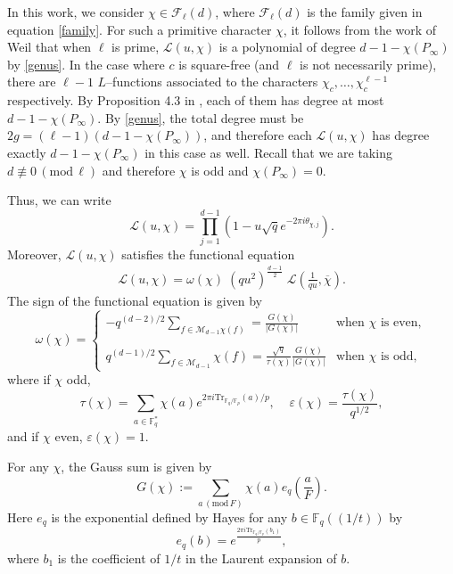 \documentclass[12pt]{amsart}
\newcommand{\F}{\mathbb{F}}
\renewcommand{\pmod}[1]{\,(\mathrm{mod}\,#1)}
\def\cL{\mathcal{L}}
\begin{document}
In this work, we consider $\chi \in \mathcal{F}_{\ell}(d)$, where $\mathcal{F}_{\ell}(d)$ is the family given in equation \eqref{family}.
For such a primitive character $\chi$, it follows from the work of Weil \cite{Weil2} that when $\ell$ is prime,  $\cL( u,\chi)$ is a polynomial of degree $d-1-\chi(P_\infty)$ by \eqref{genus}. In the case where $c$ is square-free (and $\ell$ is not necessarily prime), there are $\ell-1$ $L$--functions associated to the characters $\chi_c, \dots, \chi_c^{\ell-1}$ respectively. By Proposition 4.3 in \cite{Rosen}, each of them has degree at most $d-1-\chi(P_\infty)$. By \eqref{genus}, the total degree must be $2g=(\ell-1)(d-1-\chi(P_\infty))$, and therefore each $\cL( u,\chi)$ has degree exactly $d-1-\chi(P_\infty)$ in this case as well. Recall that we are taking $d \not \equiv 0 \pmod{\ell}$ and therefore $\chi$ is odd and $\chi(P_\infty)=0$.

Thus, we can  write
\begin{equation}\label{eq:rootsprod}\cL( u,\chi)=\prod_{j=1}^{d-1} (1-u \sqrt{q} e^{-2\pi i \theta_{\chi,j}}).\end{equation}
Moreover, $\cL( u,\chi)$
 satisfies the functional equation 
 \begin{align*} %
\cL(u,\chi) = \omega(\chi) \;(qu^2)^{\frac{d-1}{2}} \;\cL\left(\frac{1}{qu}, \overline{\chi} \right). \end{align*}
The sign of the functional equation is given by
\begin{equation}\label{eq:signfe}
\omega(\chi) = \begin{cases}-q^{(d-2)/2}\sum_{f\in \mathcal{M}_{d-1}\chi(f)}= \frac{G(\chi)}{|G(\chi)|}  & \text{when $\chi$ is even}, \\     \\
q^{(d-1)/2}\sum_{f\in \mathcal{M}_{d-1}}\chi(f)= \frac{\sqrt{q}}{\tau(\chi)}  \frac{G(\chi)}{|G(\chi)|}  & \text{when $\chi$ is odd},
\end{cases}
\end{equation}
where  if 
$\chi$ odd, 
\begin{equation}
\label{epsilonfactor}
\tau(\chi) = \sum_{a \in \F_q^*} \chi(a) e^{2 \pi i \text{Tr}_{\F_q/\F_p}(a)/p}, \;\;\;\; \varepsilon(\chi) = \frac{\tau(\chi)}{q^{1/2}},
\end{equation}
and if $\chi$ even, $ \varepsilon(\chi) =1$.

For any $\chi$, the Gauss sum is given by
$$
G(\chi) := \sum_{a \pmod{F}} \chi(a) e_q\left( \frac{a}{F} \right).$$
Here $e_q$ is the exponential defined by Hayes \cite{hayes} for any $b \in \mathbb{F}_q((1/t))$ by
\begin{equation}
\label{exp}
e_q(b) = e^{\frac{2 \pi i \text{Tr}_{\F_q/\F_p}(b_1) }{p}},
\end{equation}
where $b_1$ is the coefficient of $1/t$ in the Laurent expansion of $b$.
\end{document}
